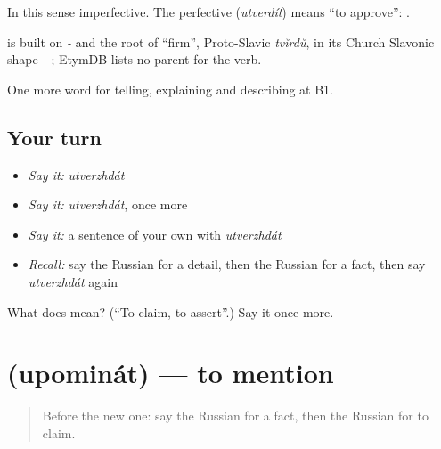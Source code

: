 In this sense imperfective. The perfective \emph{} (\emph{utverdít}) means \textquotedblleft{}to approve\textquotedblright{}: \emph{ }.

\begin{cousinweb}
\emph{} is built on \emph{-} and the root of \emph{} \textquotedblleft{}firm\textquotedblright{}, Proto-Slavic \emph{tvĭrdŭ}, in its Church Slavonic shape \emph{--}; EtymDB lists no parent for the verb.
\end{cousinweb}

\begin{grammarlens}[title={What you've built}]
One more word for telling, explaining and describing at B1.
\end{grammarlens}

\subsection*{Your turn}
\begin{itemize}
\raggedright
  \item \emph{Say it:} \emph{utverzhdát}
  \item \emph{Say it:} \emph{utverzhdát}, once more
  \item \emph{Say it:} a sentence of your own with \emph{utverzhdát}
  \item \emph{Recall:} say the Russian for a detail, then the Russian for a fact, then say \emph{utverzhdát} again
\end{itemize}

\begin{tcolorbox}[breakable,colback=teal!4,colframe=teal!35!black,title={Before you move on}]
What does  mean? (\textquotedblleft{}To claim, to assert\textquotedblright{}.) Say it once more.
\end{tcolorbox}
\section[\texorpdfstring{\ru{упоминать} (upominát)}{упоминать (upominát)}]{ (upominát) — to mention}

\label{lesson:RU-C283-upominat}



\begin{quote}
Before the new one: say the Russian for a fact, then the Russian for to claim.
\end{quote}

